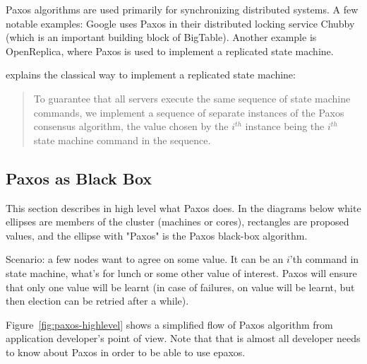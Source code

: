 \documentclass[english,11pt]{l4proj}
\begin{document}
Paxos algorithms are used primarily for synchronizing distributed systems. A few
notable examples: Google uses Paxos in their distributed locking service
Chubby\cite{chubby} (which is an important building block of BigTable). Another
example is OpenReplica\cite{openreplica}, where Paxos is used to implement a
replicated state machine.

\cite{paxos-simple} explains the classical way to implement a replicated state
machine:

\begin{quote}
To guarantee that all servers execute the same sequence of state machine
commands, we implement a sequence of separate instances of the Paxos consensus
algorithm, the value chosen by the $i^{th}$ instance being the $i^{th}$ state
machine command in the sequence.
\end{quote}

\subsection{Paxos as Black Box}

This section describes in high level what Paxos does. In the diagrams below
white ellipses are members of the cluster (machines or cores), rectangles are
proposed values, and the ellipse with "Paxos" is the Paxos black-box algorithm.

Scenario: a few nodes want to agree on some value. It can be an $i$'th command in
state machine, what's for lunch or some other value of interest. Paxos will
ensure that only one value will be learnt (in case of failures, on value will be
learnt, but then election can be retried after a while).

Figure~\ref{fig:paxos-highlevel} shows a simplified flow of Paxos algorithm from
application developer's point of view. Note that that is almost all developer
needs to know about Paxos in order to be able to use epaxos\cite{epaxos}.
\end{document}
